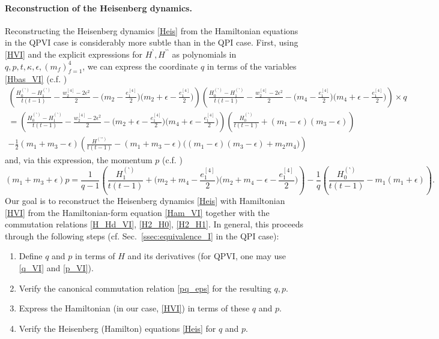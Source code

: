\documentclass[12pt,a4paper]{article}
\numberwithin{equation}{section}
\begin{document}
\paragraph{Reconstruction of the Heisenberg dynamics.}
Reconstructing the Heisenberg dynamics \eqref{Heis} from the Hamiltonian equations in the QPVI case is considerably more subtle than in the QPI case. First, using \eqref{HVI} and the explicit expressions for $H^\backprime,H^{\backprime\backprime}$ as polynomials in $q,p,t,\kappa,\epsilon,(m_f)_{f=1}^4$, we can express the coordinate $q$ in terms of the variables \eqref{Hbas_VI} (c.f. \cite[(D.7)]{BST25})
\begin{multline}\label{q_VI}
\left(\frac{H_0^{(\backprime)}{-}H_1^{(\backprime)}}{t(t{-}1)}{-}\frac{w_2^{[4]}{-}2\epsilon^2}2{-}\Big(m_2{-}\frac{e_1^{[4]}}2\Big)\Big(m_2{+}\epsilon{-}\frac{e_1^{[4]}}2\Big)\right)\left(\frac{H_0^{(\backprime)}{-}H_1^{(\backprime)}}{t(t{-}1)}{-}\frac{w_2^{[4]}{-}2\epsilon^2}2{-}\Big(m_4{-}\frac{e_1^{[4]}}2\Big)\Big(m_4{+}\epsilon{-}\frac{e_1^{[4]}}2\Big)\right)\times q\\
=\left(\frac{H_0^{(\backprime)}{-}H_1^{(\backprime)}}{t(t{-}1)}{-}\frac{w_2^{[4]}{-}2\epsilon^2}2{-}\Big(m_2{+}\epsilon{-}\frac{e_1^{[4]}}2\Big)\Big(m_4{+}\epsilon{-}\frac{e_1^{[4]}}2\Big)\right)\left(\frac{H_0^{(\backprime)}}{t(t{-}1)}+(m_1{-}\epsilon)(m_3{-}\epsilon)\right)\\
-\frac12(m_1{+}m_3{-}\epsilon)\left(\frac{H^{(\backprime\backprime)}}{t(t{-}1)}-(m_1{+}m_3{-}\epsilon)\big((m_1{-}\epsilon)(m_3{-}\epsilon){+}m_2m_4\big)\right)
\end{multline}
and, via this expression, the momentum $p$ (c.f. \cite[(D.8)]{BST25})
\begin{equation}\label{p_VI}
(m_1{+}m_3{+}\epsilon)p=\frac1{q{-}1}\left(\frac{H_1^{(\backprime)}}{t(t{-}1)}{+}\Big(m_2{+}m_4{-}\frac{e_1^{[4]}}2\Big)\Big(m_2{+}m_4{-}\epsilon{-}\frac{e_1^{[4]}}2\Big)\right)-\frac1{q}\left(\frac{H_0^{(\backprime)}}{t(t{-}1)}{-}m_1(m_1{+}\epsilon)\right).
\end{equation}
Our goal is to reconstruct the Heisenberg dynamics \eqref{Heis} with Hamiltonian \eqref{HVI} from the Hamiltonian-form equation \eqref{Ham_VI} together with the commutation relations \eqref{H_Hd_VI}, \eqref{H2_H0}, \eqref{H2_H1}. In general, this proceeds through the following steps (cf. Sec.~\ref{ssec:equivalence_I} in the QPI case):
\begin{enumerate}
    \item Define $q$ and $p$ in terms of $H$ and its derivatives (for QPVI, one may use \eqref{q_VI} and \eqref{p_VI}).
    \item Verify the canonical commutation relation \eqref{pq_eps} for the resulting $q,p$.
    \item Express the Hamiltonian (in our case, \eqref{HVI}) in terms of these $q$ and $p$.
    \item Verify the Heisenberg (Hamilton) equations \eqref{Heis} for $q$ and $p$.
\end{enumerate}
\end{document}
